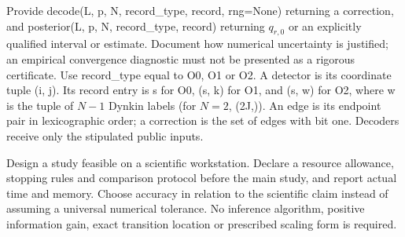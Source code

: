 \documentclass[11pt,letterpaper]{article}
\begin{document}
Provide {\ttfamily\small decode(\allowbreak{}L,\allowbreak{} p,\allowbreak{} N,\allowbreak{} record\_\allowbreak{}type,\allowbreak{} record,\allowbreak{} rng=None)} returning a correction, and {\ttfamily\small posterior(\allowbreak{}L,\allowbreak{} p,\allowbreak{} N,\allowbreak{} record\_\allowbreak{}type,\allowbreak{} record)} returning $q_{r,0}$ or an explicitly qualified interval or estimate. Document how numerical uncertainty is justified; an empirical convergence diagnostic must not be presented as a rigorous certificate. Use {\ttfamily\small record\_\allowbreak{}type} equal to {\ttfamily\small O0}, {\ttfamily\small O1} or {\ttfamily\small O2}. A detector is its coordinate tuple {\ttfamily\small (\allowbreak{}i,\allowbreak{} j)}. Its record entry is {\ttfamily\small s} for {\ttfamily\small O0}, {\ttfamily\small (\allowbreak{}s,\allowbreak{} k)} for {\ttfamily\small O1}, and {\ttfamily\small (\allowbreak{}s,\allowbreak{} w)} for {\ttfamily\small O2}, where {\ttfamily\small w} is the tuple of $N-1$ Dynkin labels (for $N=2$, {\ttfamily\small (\allowbreak{}2J,\allowbreak{})}). An edge is its endpoint pair in lexicographic order; a correction is the set of edges with bit one. Decoders receive only the stipulated public inputs.\par

Design a study feasible on a scientific workstation. Declare a resource allowance, stopping rules and comparison protocol before the main study, and report actual time and memory. Choose accuracy in relation to the scientific claim instead of assuming a universal numerical tolerance. No inference algorithm, positive information gain, exact transition location or prescribed scaling form is required.\par
\end{document}
